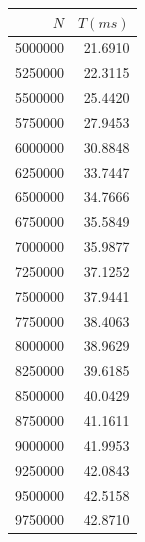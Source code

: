 \documentclass[13pt]{beamer}
\begin{document}
\begin{frame}
\begin{columns}
            \begin{column}{0.2\textwidth}
                \begin{table}
                    \tiny
                    \centering
                    \begin{tabular}{|r|r|}
                        \hline
                        $N$ & $T(ms)$ \\
                        \hline

                        5000000 & 21.6910 \\ 
                        5250000 & 22.3115 \\ 
                        5500000 & 25.4420 \\ 
                        5750000 & 27.9453 \\ 
                        6000000 & 30.8848 \\ 
                        6250000 & 33.7447 \\ 
                        6500000 & 34.7666 \\ 
                        6750000 & 35.5849 \\ 
                        7000000 & 35.9877 \\ 
                        7250000 & 37.1252 \\ 
                        7500000 & 37.9441 \\ 
                        7750000 & 38.4063 \\ 
                        8000000 & 38.9629 \\ 
                        8250000 & 39.6185 \\ 
                        8500000 & 40.0429 \\ 
                        8750000 & 41.1611 \\ 
                        9000000 & 41.9953 \\ 
                        9250000 & 42.0843 \\ 
                        9500000 & 42.5158 \\ 
                        9750000 & 42.8710 \\ 

                        \hline
                    \end{tabular}
                \end{table}
            \end{column}



\end{columns}
\end{frame}
\end{document}
